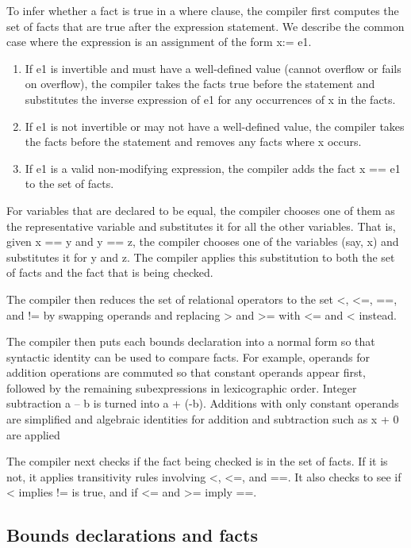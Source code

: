 To infer whether a fact is true in a where clause, the compiler first
computes the set of facts that are true after the expression statement.
We describe the common case where the expression is an assignment of the
form x:= e1.

\begin{enumerate}
\item
  If e1 is invertible and must have a well-defined value (cannot
  overflow or fails on overflow), the compiler takes the facts true
  before the statement and substitutes the inverse expression of e1 for
  any occurrences of x in the facts.
\item
  If e1 is not invertible or may not have a well-defined value, the
  compiler takes the facts before the statement and removes any facts
  where x occurs.
\item
  If e1 is a valid non-modifying expression, the compiler adds the fact
  x == e1 to the set of facts.
\end{enumerate}

For variables that are declared to be equal, the compiler chooses one of
them as the representative variable and substitutes it for all the other
variables. That is, given x == y and y == z, the compiler chooses one of
the variables (say, x) and substitutes it for y and z. The compiler
applies this substitution to both the set of facts and the fact that is
being checked.

The compiler then reduces the set of relational operators to the set
\textless{}, \textless{}=, ==, and != by swapping operands and replacing
\textgreater{} and \textgreater{}= with \textless{}= and \textless{}
instead.

The compiler then puts each bounds declaration into a normal form so
that syntactic identity can be used to compare facts. For example,
operands for addition operations are commuted so that constant operands
appear first, followed by the remaining subexpressions in lexicographic
order. Integer subtraction a -- b is turned into a + (-b). Additions
with only constant operands are simplified and algebraic identities for
addition and subtraction such as x + 0 are applied

The compiler next checks if the fact being checked is in the set of
facts. If it is not, it applies transitivity rules involving
\textless{}, \textless{}=, and ==. It also checks to see if \textless{}
implies != is true, and if \textless{}= and \textgreater{}= imply ==.

\subsection{Bounds declarations and facts}

